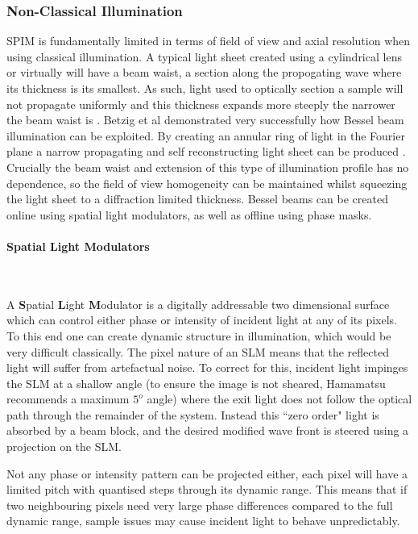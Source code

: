 \subsubsection{Non-Classical Illumination}

SPIM is fundamentally limited in terms of field of view and axial resolution when using classical illumination. A typical light sheet created using a cylindrical lens or virtually will have a beam waist, a section along the propogating wave where its thickness is its smallest. As such, light used to optically section a sample will not propagate uniformly and this thickness expands more steeply the narrower the beam waist is \cite{Silfvast2004}.  Betzig et al demonstrated very successfully how Bessel beam illumination can be exploited. By creating an annular ring of light in the Fourier plane a narrow propagating and self reconstructing light sheet can be produced \cite{Chen2014}. Crucially the beam waist and extension of this type of illumination profile has no dependence, so the field of view homogeneity can be maintained whilst squeezing the light sheet to a diffraction limited thickness. Bessel beams can be created online using spatial light modulators, as well as offline using phase masks.

\paragraph{Spatial Light Modulators}~

A \textbf{S}patial \textbf{L}ight \textbf{M}odulator is a digitally addressable two dimensional surface which can control either phase or intensity of incident light at any of its pixels. To this end one can create dynamic structure in illumination, which would be very difficult classically. %
The pixel nature of an SLM means that the reflected light will suffer from artefactual noise. To correct for this, incident light impinges the SLM at a shallow angle (to ensure the image is not sheared, Hamamatsu recommends a maximum $5^o$ angle)  where the exit light does not follow the optical path through the remainder of the system. Instead this ``zero order" light is absorbed by a beam block, and the desired modified wave front is steered using a projection on the SLM.

Not any phase or intensity pattern can be projected either, each pixel will have a limited pitch with quantised steps through its dynamic range. This means that if two neighbouring pixels need very large phase differences compared to the full dynamic range, sample issues may cause incident light to behave unpredictably.

